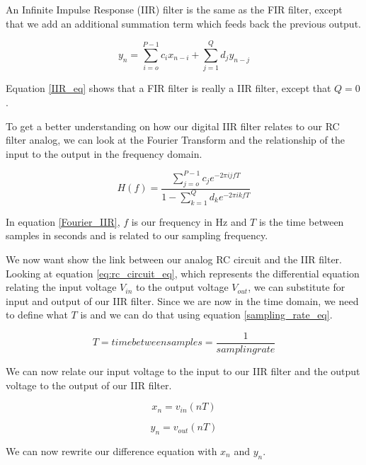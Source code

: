An Infinite Impulse Response (IIR) filter is the same as the FIR filter, except that we add an additional summation term which feeds back the previous output.

\begin{equation}\label{IIR_eq}
y_n=\displaystyle\sum\limits_{i=o}^{P-1} c_ix_{n-i}+\displaystyle\sum\limits_{j=1}^{Q} d_jy_{n-j}
\end{equation}

Equation \ref{IIR_eq} shows that a FIR filter is really a IIR filter, except that $Q=0$.  

To get a better understanding on how our digital IIR filter relates to our RC filter analog, we can look at the Fourier Transform and the relationship of the input to the output in the frequency domain.

\begin{equation}\label{Fourier_IIR}
H(f)=\frac{\displaystyle\sum\limits_{j=o}^{P-1} c_je^{-2\pi ijfT}}{1-\displaystyle\sum\limits_{k=1}^{Q} d_ke^{-2\pi ikfT}}
\end{equation}

In equation \ref{Fourier_IIR}, $f$ is our frequency in Hz and $T$ is the time between samples in seconds and is related to our sampling frequency.

We now want show the link between our analog RC circuit and the IIR filter.  Looking at equation \ref{eq:rc_circuit_eq}, which represents the differential equation relating the input voltage $V_{in}$ to the output voltage $V_{out}$, we can substitute for input and output of our IIR filter.  Since we are now in the time domain, we need to define what $T$ is and we can do that using equation \ref{sampling_rate_eq}.

\begin{equation}\label{sampling_rate_eq}
T=time between samples=\frac{1}{sampling rate}
\end{equation}

We can now relate our input voltage to the input to our IIR filter and the output voltage to the output of our IIR filter.

\begin{equation}\label{input_IIR}
x_n=v_{in}(nT)
\end{equation}

\begin{equation}\label{output_IIR}
y_n=v_{out}(nT)
\end{equation}

We can now rewrite our difference equation with $x_n$ and $y_n$.

